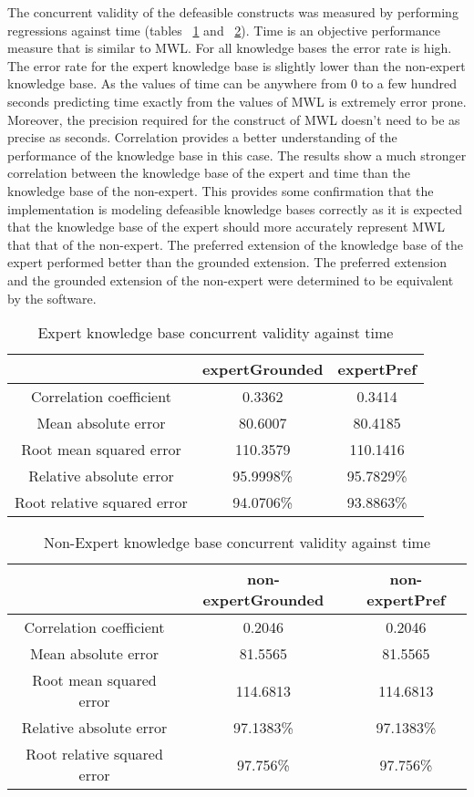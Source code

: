 The concurrent validity of the defeasible constructs was measured by performing regressions against time (tables ~\ref{tab:eccurrent_time} and ~\ref{tab:neccurrent_time}). Time is an objective performance measure that is similar to MWL. For all knowledge bases the error rate is high. The error rate for the expert knowledge base is slightly lower than the non-expert knowledge base. As the values of time can be anywhere from 0 to a few hundred seconds predicting time exactly from the values of MWL is extremely error prone. Moreover, the precision required for the construct of MWL doesn't need to be as precise as seconds. Correlation provides a better understanding of the performance of the knowledge base in this case. The results show a much stronger correlation between the knowledge base of the expert and time than the knowledge base of the non-expert. This provides some confirmation that the implementation is modeling defeasible knowledge bases correctly as it is expected that the knowledge base of the expert should more accurately represent MWL that that of the non-expert. The preferred extension of the knowledge base of the expert performed better than the grounded extension. The preferred extension and the grounded extension of the non-expert were determined to be equivalent by the software.

\begin{table}[!h]
\centering
\begin{tabular}{|c|c|c|}
                            &  expertGrounded & expertPref \\ \hline
Correlation coefficient     & 0.3362        & 0.3414      \\
Mean absolute error         & 80.6007       & 80.4185     \\
Root mean squared error     & 110.3579      & 110.1416  \\
Relative absolute error     & 95.9998\%     & 95.7829\% \\
Root relative squared error & 94.0706\%     & 93.8863\% \\
\end{tabular}
\caption{Expert knowledge base concurrent validity against time}
\label{tab:eccurrent_time}
\end{table}

\begin{table}[!h]
\centering
\begin{tabular}{|c|c|c|}
                            &   non-expertGrounded  & non-expertPref \\ \hline
Correlation coefficient     &  0.2046         & 0.2046  \\
Mean absolute error         &  81.5565        & 81.5565  \\
Root mean squared error     & 114.6813       & 114.6813  \\
Relative absolute error     & 97.1383\%      & 97.1383\%  \\
Root relative squared error & 97.756\%       & 97.756\%  \\
\end{tabular}
\caption{Non-Expert knowledge base concurrent validity against time}
\label{tab:neccurrent_time}
\end{table}


